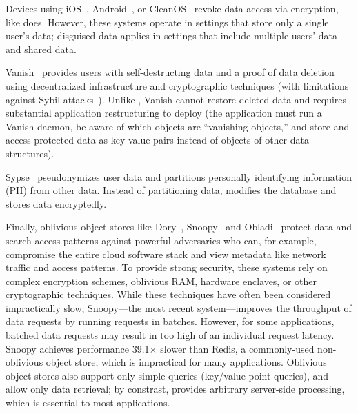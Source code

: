 %
Devices using iOS~\cite{applesecurity}, Android~\cite{applesecurity}, or
CleanOS~\cite{cleanos} revoke data access via encryption, like \sys does.
%
However, these systems operate in settings that store only a single user's data;
disguised data applies in settings that include multiple users' data and shared
data.
%

%
Vanish~\cite{vanish} provides users with self-destructing data and a proof of
data deletion using decentralized infrastructure and cryptographic techniques
(with limitations against Sybil attacks~\cite{defeat_vanish}). Unlike \sys,
Vanish cannot restore deleted data and requires substantial application
restructuring to deploy (\eg the application must run a Vanish daemon, be aware of which
objects are ``vanishing objects,'' and store and access protected data
as key-value pairs instead of objects of other data structures).
%

%
Sypse~\cite{sypse} pseudonymizes user data and partitions personally identifying
information (PII) from other data. Instead of partitioning data, \sys modifies
the database and stores \xxed data encryptedly.
%

%
Finally, oblivious object stores like Dory~\cite{dory}, Snoopy~\cite{snoopy} and
Obladi~\cite{obladi} protect data and search access patterns against powerful
adversaries who can, for example, compromise the entire cloud software stack and
view metadata like network traffic and access patterns. To provide strong
security, these systems rely on complex encryption schemes, oblivious RAM,
hardware enclaves, or other cryptographic techniques.
%
While these techniques have often been considered impractically slow,
Snoopy---the most recent system---improves the throughput of data requests by
running requests in batches.  However, for some applications, batched data
requests may result in too high of an individual request latency.
%
Snoopy achieves performance 39.1$\times$ slower than Redis, a
commonly-used non-oblivious object store, which is impractical for many 
applications.
%
Oblivious object stores also support only simple queries (\eg key/value point
queries), and allow only data retrieval; by constrast, \sys provides arbitrary
server-side processing, which is essential to most applications. 
%

